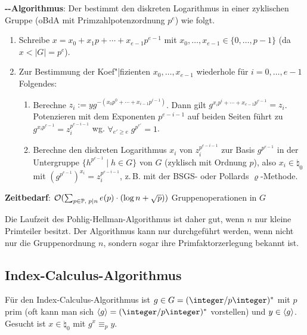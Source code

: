 \textbf{--Algorithmus}:
Der  bestimmt den diskreten Logarithmus
in einer zyklischen Gruppe (oBdA mit Primzahlpotenzordnung $p^e$) wie folgt.
\begin{enumerate}
    \item
    Schreibe $x = x_0 + x_1 p + \dotsb + x_{e-1} p^{e-1}$ mit
    $x_0, \dotsc, x_{e-1} \in \{0, \dotsc, p-1\}$
    (da $x < |G| = p^e$).

    \item
    Zur Bestimmung der Koef"|fizienten $x_0, \dotsc, x_{e-1}$ wiederhole für
    $i = 0, \dotsc, e - 1$ Folgendes:
    \begin{enumerate}
        \item
        Berechne $z_i := yg^{-(x_0 p^0 + \dotsb + x_{i-1} p^{i-1})}$.
        Dann gilt $g^{x_i p^i + \dotsb + x_{e-1} p^{e-1}} = z_i$.
        Potenzieren mit dem Exponenten $p^{e-i-1}$ auf beiden Seiten führt zu
        $g^{x_i p^{e-1}} = z_i^{p^{e-i-1}}$ wg. $\forall_{e' \ge e}\; g^{p^{e'}} = 1$.

        \item
        Berechne den diskreten Logarithmus $x_i$ von $z_i^{p^{e-i-1}}$ zur Basis $g^{p^{e-1}}$
        in der Untergruppe $\{h^{p^{e-1}} \;|\; h \in G\}$ von $G$
        (zyklisch mit Ordnung $p$),
        also $x_i \in \natural_0$ mit $(g^{p^{e-1}})^{x_i} = z_i^{p^{e-i-1}}$,
        z.\,B. mit der BSGS- oder Pollards $\varrho$-Methode.
    \end{enumerate}
\end{enumerate}

\linie

\textbf{Zeitbedarf}:
$\mathcal{O}(\sum_{p \in \mathbb{P},\; p \mid n} e(p) \cdot (\log n + \sqrt{p}))$ Gruppenoperationen in $G$

Die Laufzeit des Pohlig-Hellman-Algorithmus ist daher gut, wenn $n$ nur kleine Primteiler besitzt.
Der Algorithmus kann nur durchgeführt werden, wenn nicht nur die Gruppenordnung $n$,
sondern sogar ihre Primfaktorzerlegung bekannt ist.

\pagebreak

\subsection{%
    Index-Calculus-Algorithmus%
}

Für den Index-Calculus-Algorithmus ist $g \in G = (\ZpZ)^\ast$ mit $p$ prim
(oft kann man sich $\erzeugnis{g} = (\ZpZ)^\ast$ vorstellen) und $y \in \langle g\rangle$.
Gesucht ist $x \in \natural_0$ mit $g^x \equiv_p y$.

